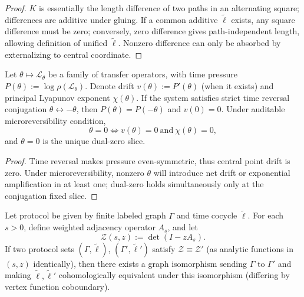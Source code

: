 \begin{proof}
\(K\) is essentially the length difference of two paths in an alternating square; differences are additive under gluing.
If a common additive \(\widetilde\ell\) exists, any square difference must be zero; conversely, zero difference gives path-independent length, allowing definition of unified \(\widetilde\ell\).
Nonzero difference can only be absorbed by externalizing to central coordinate.
\end{proof}

\begin{theorem}\label{thm:xi-critical-slice-pressure-zero-drift-lyapunov}
Let \(\theta\mapsto\mathcal L_\theta\) be a family of transfer operators, with time pressure
\(
P(\theta):=\log\rho(\mathcal L_\theta)
\).
Denote drift \(v(\theta):=P'(\theta)\) (when it exists) and principal Lyapunov exponent \(\chi(\theta)\).
If the system satisfies strict time reversal conjugation \(\theta\leftrightarrow-\theta\), then \(P(\theta)=P(-\theta)\) and \(v(0)=0\).
Under auditable microreversibility condition,
\[
\theta=0
\Longleftrightarrow
v(\theta)=0\ \text{and}\ \chi(\theta)=0,
\]
and \(\theta=0\) is the unique dual-zero slice.
\end{theorem}

\begin{proof}
Time reversal makes pressure even-symmetric, thus central point drift is zero.
Under microreversibility, nonzero \(\theta\) will introduce net drift or exponential amplification in at least one; dual-zero holds simultaneously only at the conjugation fixed slice.
\end{proof}

\begin{theorem}\label{thm:xi-time-zeta-identifiability-markov-cohomology}
Let protocol be given by finite labeled graph \(\Gamma\) and time cocycle \(\widetilde\ell\).
For each \(s>0\), define weighted adjacency operator \(A_s\), and let
\[
\mathcal Z(s,z):=\det(I-zA_s).
\]
If two protocol sets \((\Gamma,\widetilde\ell)\), \((\Gamma',\widetilde\ell')\) satisfy
\(
\mathcal Z\equiv \mathcal Z'
\)
(as analytic functions in \((s,z)\) identically), then there exists a graph isomorphism sending \(\Gamma\) to \(\Gamma'\) and making \(\widetilde\ell,\widetilde\ell'\) cohomologically equivalent under this isomorphism (differing by vertex function coboundary).
\end{theorem}

